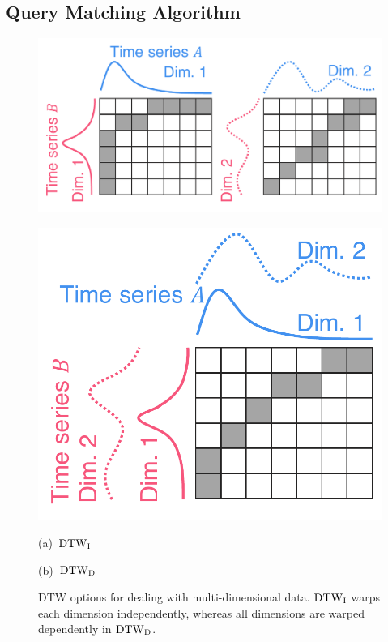 \subsection{Query Matching Algorithm}\label{sec:matchingAlgorithm}
\begin{figure}[tb]
    \begin{minipage}{0.62\linewidth}
        \centering
        \includegraphics[width=.95\linewidth]{vgtc_journal_latex/figures/DTWI.pdf}\\
    \end{minipage}
    \begin{minipage}{0.37\linewidth}
        \centering
        \includegraphics[width=.95\linewidth]{vgtc_journal_latex/figures/DTWD.pdf}\\
    \end{minipage}
    \begin{minipage}{0.62\linewidth}
        \centering
        \footnotesize{\sf(a)~${\rm DTW}_{\rm I}$}
    \end{minipage}
    \begin{minipage}{0.37\linewidth}
        \centering
        \footnotesize{\sf(b)~${\rm DTW}_{\rm D}$}
    \end{minipage}
    \caption{DTW options for dealing with multi-dimensional data.
    ${\rm DTW}_{\rm I}$ warps each dimension independently, whereas all dimensions are warped dependently in ${\rm DTW}_{\rm D}$.}
    \label{fig:DTW}
\end{figure}
